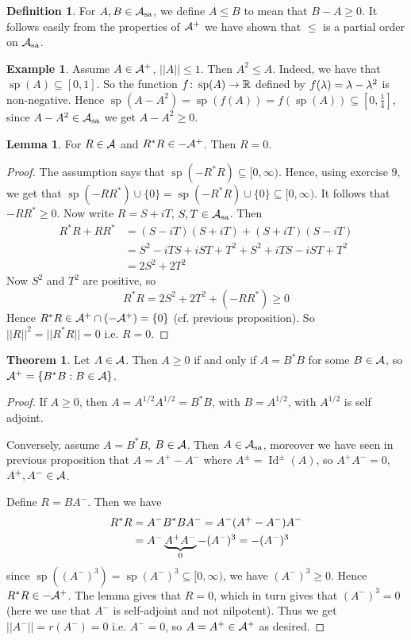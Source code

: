 \documentclass[10pt,english,a4paper]{article}
\theoremstyle{definition}
\newtheorem*{definition}{Definition}
\newtheorem*{theorem}{Theorem}
\newtheorem*{lemma}{Lemma}
\newtheorem*{example}{Example}
\def\Assa{\As_{\text{sa}}}
\DeclareMathOperator{\Id}{Id}
\DeclareMathOperator{\Sp}{sp}
\begin{document}
\begin{definition}
    For $A,B \in \Assa$, we define $A \leq B$ to mean that $B-A \geq 0$. It follows 
    easily from the properties of $\mathcal{A}^+$ we have shown that $\leq$ is a
    partial order on $\Assa$.
\end{definition}
\begin{example}
    Assume $A \in \mathcal{A}^+$, $||A|| \leq 1$. Then $A^2 \leq A$. Indeed, we have that 
    $\Sp(A) \subseteq [0,1]$. So the function $f\colon \Sp(A)\to \R$ 
defined by $f(\lambda) = \lambda - \lambda^2$ is non-negative. Hence 
$\Sp(A-A^2) = \Sp(f(A)) = f(\Sp(A)) \subseteq [0,\tfrac{1}{4}]$, since $A-A^2 \in \Assa$
we get $A-A^2 \geq 0$.
\end{example}

\begin{lemma}
    For $R \in \mathcal{A}$ and $R^*R \in -\mathcal{A}^+$. Then $R =0$.
\end{lemma}
\begin{proof}
    The assumption says that $\Sp(-R^*R) \subseteq [ 0, \infty)$. Hence, using 
    exercise 9, we get that $\Sp(-RR^*)\cup\{0\} = \Sp(-R^*R)\cup \{0\}
    \subseteq [0,\infty)$. It follows that $-RR^* \geq 0$.
    Now write $R = S + iT$, $S,T \in \Assa$. Then 
    \begin{align*}
    R^*R+RR^* &= (S-iT)(S+iT) + (S+iT)(S-iT) \\
    &= S^2 -iTS + iST + T^2 + S^2 + iTS -iST + T^2\\
    &= 2S^2 + 2T^2
    \end{align*}    
    Now $S^2$ and $T^2$ are positive, so 
    \[R^* R = 2S^2 + 2T^2 + (-RR^*) \geq 0\]
    Hence $R^*R \in \mathcal{A}^+ \cap (-\mathcal{A}^+) = \{0\}$ (cf. previous proposition).
    So $||R||^2 = ||R^*R|| = 0$ i.e. $R=0$.

\end{proof}

\begin{theorem}
    Let $A \in \mathcal{A}$. Then $A \geq 0$ if and only if $A = B^*B$
for some $B \in \mathcal{A}$, so $\mathcal{A}^+ = \{ B^*B : B \in \mathcal{A} \}$.
\end{theorem}
\begin{proof}
    If $A\geq 0$, then $A = A^{1/2}A^{1/2} = B^*B$, with $B = A^{1/2}$, with 
$A^{1/2}$ is self adjoint. 

Conversely, assume $A = B^*B$, $B \in \mathcal{A}$. Then $A \in \Assa$, moreover we have 
seen in previous proposition that $A = A^+ -A^-$ where $A^{\pm}  = \Id^{\pm}(A)$,
so $A^+A^- = 0$, $A^+,A^- \in \mathcal{A}$.

Define $R = BA^-$. Then we have
\begin{align*}
    R^*R &= A^-B^*BA^- = A^-(A^+-A^-)A^- \\
         &= A^- \underbrace{A^+A^-}_{0} - (A^-)^3 = - (A^-)^3
\end{align*}
since $\Sp((A^-)^3) = \Sp(A^-)^3 \subseteq [0,\infty)$, we have
$(A^-)^3 \geq 0$. Hence $R^*R \in -\mathcal{A}^+$.
The lemma gives that $R=0$, which in turn gives that $(A^-)^3 = 0$ 
(here we use that $A^-$ is self-adjoint and not nilpotent).  
Thus we get $||A^-|| = r(A^-) = 0$ i.e. $A^{-} = 0$, so $A = A^{+} \in \mathcal{A}^+$
as desired. 
\end{proof}
\end{document}
